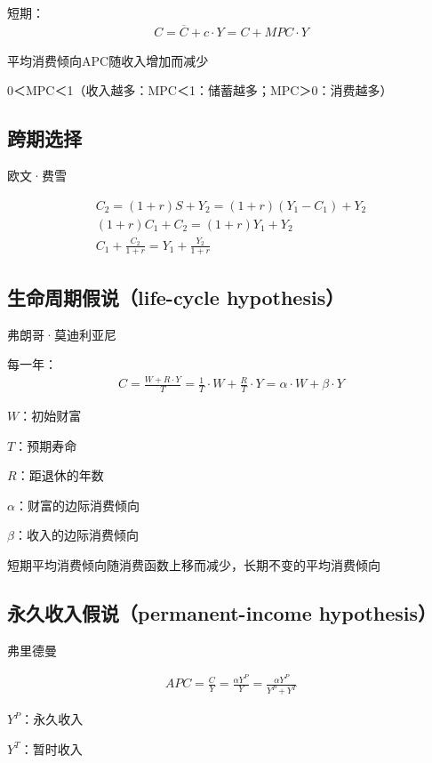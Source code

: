 \documentclass[12pt]{book}
\begin{document}
短期：
\begin{gather*}
  C = \overline{C} +  c\cdot Y = C + MPC\cdot Y
\end{gather*}


\par 平均消费倾向APC随收入增加而减少
\par 0＜MPC＜1（收入越多：MPC＜1：储蓄越多；MPC＞0：消费越多）


\subsection{跨期选择}

欧文·费雪

\begin{gather*}
C_2=\left(1+r\right)S+Y_2=\left(1+r\right)\left(Y_1-C_1\right)+Y_2\\
\left(1+r\right)C_1+C_2=\left(1+r\right)Y_1+Y_2\\
C_1+\frac{C_2}{1+r}=Y_1+\frac{Y_2}{1+r}
\end{gather*}


\subsection{生命周期假说（life-cycle hypothesis）}

弗朗哥·莫迪利亚尼


每一年：
\begin{gather*}
C=\frac{W+R·Y}{T}
=\frac{1}{T}·W+\frac{R}{T}·Y
=\alpha·W+\beta·Y
\end{gather*}
\par $W$：初始财富
\par $T$：预期寿命
\par $R$：距退休的年数
\par $\alpha$：财富的边际消费倾向
\par $\beta$：收入的边际消费倾向



\par 短期平均消费倾向随消费函数上移而减少，长期不变的平均消费倾向




\subsection{永久收入假说（permanent-income hypothesis）}

弗里德曼

\begin{gather*}
APC=\frac{C}{Y}=\frac{\alpha Y^P}{Y}=\frac{\alpha Y^P}{Y^P+Y^T}
\end{gather*}
\par $Y^P$：永久收入
\par $Y^T$：暂时收入
\end{document}
